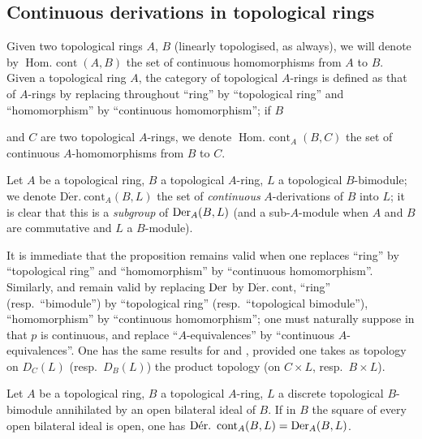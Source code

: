 \subsection{Continuous derivations in topological rings}
\label{subsection:0.20.3}

\begin{env}[20.3.1]
\label{0.20.3.1}
Given two topological rings $A$, $B$ (linearly topologised, as always), we will denote by $\operatorname{Hom.\ cont}(A,B)$ the set of continuous homomorphisms from $A$ to $B$.
Given a topological ring $A$, the category of topological $A$-rings is defined as that of $A$-rings  by replacing throughout ``ring'' by ``topological ring'' and ``homomorphism'' by ``continuous homomorphism''; if $B$

and $C$ are two topological $A$-rings, we denote $\operatorname{Hom.\ cont}_A(B,C)$ the set of continuous $A$-homomorphisms from $B$ to $C$.

Let $A$ be a topological ring, $B$ a topological $A$-ring, $L$ a topological $B$-bimodule; we denote $\operatorname{D\acute{e}r.\ cont}_A(B,L)$ the set of \emph{continuous} $A$-derivations of $B$ into $L$; it is clear that this is a \emph{subgroup} of $\operatorname{Der}_A(B,L)$ (and a sub-$A$-module when $A$ and $B$ are commutative and $L$ a $B$-module).
\end{env}

\begin{env}[20.3.2]
\label{0.20.3.2}
It is immediate that the proposition  remains valid when one replaces ``ring'' by ``topological ring'' and ``homomorphism'' by ``continuous homomorphism''.
Similarly,  and  remain valid by replacing $\operatorname{Der}$ by $\operatorname{D\acute{e}r.\ cont}$, ``ring'' (resp.\ ``bimodule'') by ``topological ring'' (resp.\ ``topological bimodule''), ``homomorphism'' by ``continuous homomorphism''; one must naturally suppose in  that $p$ is continuous, and replace ``$A$-equivalences'' by ``continuous $A$-equivalences''.
One has the same results for  and , provided one takes as topology on $D_C(L)$ (resp.\ $D_B(L)$) the product topology (on $C\times L$, resp.\ $B\times L$).
\end{env}

\begin{proposition}[20.3.3]
\label{0.20.3.3}
Let $A$ be a topological ring, $B$ a topological $A$-ring, $L$ a discrete topological $B$-bimodule annihilated by an open bilateral ideal of $B$.
If in $B$ the square of every open bilateral ideal is open, one has $\operatorname{D\acute{e}r.\ cont}_A(B,L)=\Der_A(B,L)$.
\end{proposition}

